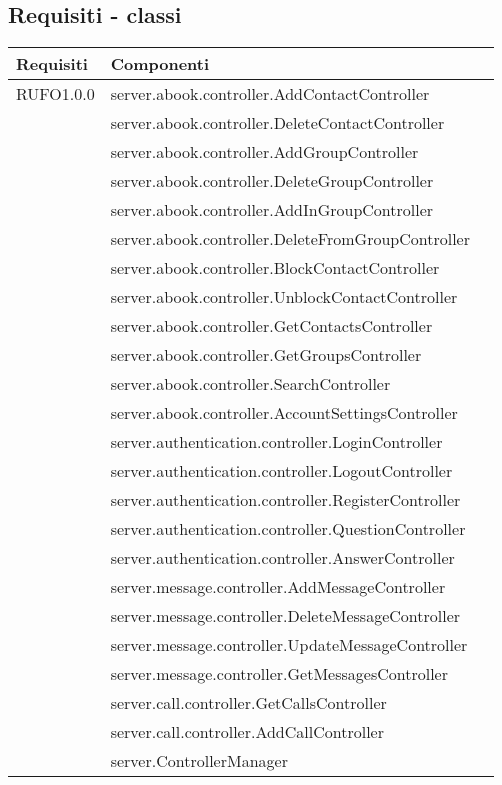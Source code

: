 \subsection{Requisiti - classi}

\begin{center}
\begin{longtable}{lp{}l}
\toprule Requisiti &  Componenti\\
\midrule
RUFO1.0.0 & server.abook.controller.AddContactController\\
& server.abook.controller.DeleteContactController\\
& server.abook.controller.AddGroupController\\
& server.abook.controller.DeleteGroupController\\
& server.abook.controller.AddInGroupController\\
& server.abook.controller.DeleteFromGroupController\\
& server.abook.controller.BlockContactController\\
& server.abook.controller.UnblockContactController\\
& server.abook.controller.GetContactsController\\
& server.abook.controller.GetGroupsController\\
& server.abook.controller.SearchController\\
& server.abook.controller.AccountSettingsController\\
& server.authentication.controller.LoginController\\
& server.authentication.controller.LogoutController\\
& server.authentication.controller.RegisterController\\
& server.authentication.controller.QuestionController\\
& server.authentication.controller.AnswerController\\
& server.message.controller.AddMessageController\\
& server.message.controller.DeleteMessageController\\
& server.message.controller.UpdateMessageController\\
& server.message.controller.GetMessagesController\\
& server.call.controller.GetCallsController\\
& server.call.controller.AddCallController\\
& server.ControllerManager\\

\end{longtable}
\end{center}

